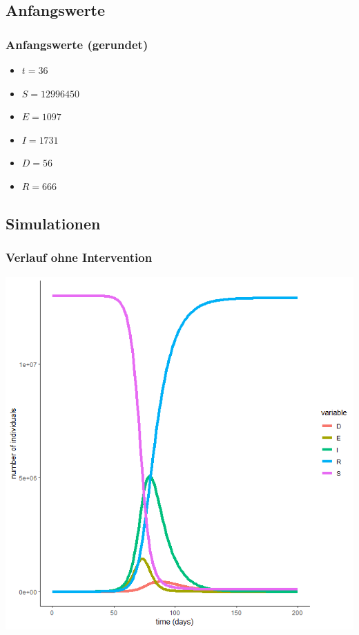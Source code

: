 \documentclass{beamer}
\begin{document}
\subsection{Anfangswerte}
\begin{frame}
	\frametitle{Anfangswerte (gerundet)}
	\begin{itemize}
		\item $t = 36$
		\item $S = 12 996 450$
		\item $E = 1097$
		\item $I = 1731$
		\item $D = 56$
		\item $R = 666$		
	\end{itemize}
\end{frame}

\subsection{Simulationen}
\begin{frame}
	\frametitle{Verlauf ohne Intervention}
	\begin{center}
		\includegraphics[scale=0.45]{delta=0,01,beta_unveraendert,alles.png}
	\end{center}
\end{frame}
\end{document}
